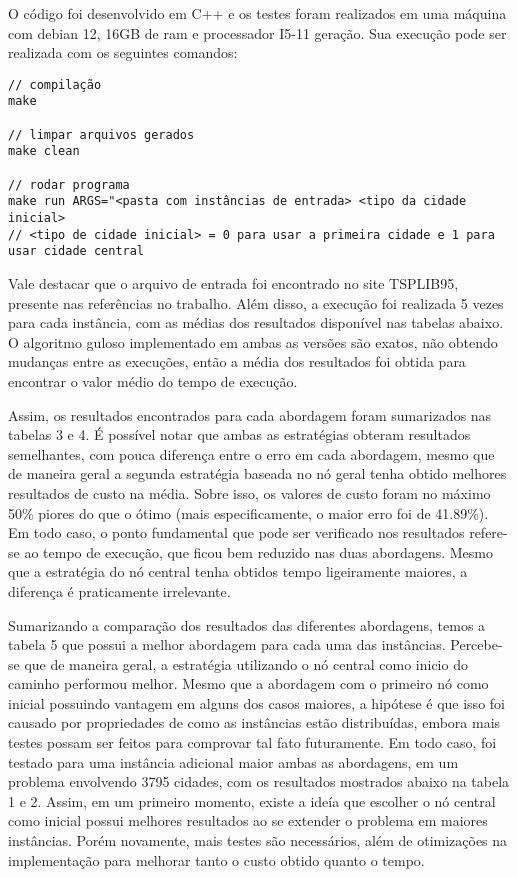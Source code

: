 \documentclass[10pt]{extarticle} %
\begin{document}
O código foi desenvolvido em C++ e os testes foram realizados em uma máquina com debian 12, 16GB de ram e processador I5-11 geração. Sua execução pode ser realizada com os seguintes comandos:

\begin{verbatim}
// compilação
make

// limpar arquivos gerados
make clean

// rodar programa
make run ARGS="<pasta com instâncias de entrada> <tipo da cidade inicial>
// <tipo de cidade inicial> = 0 para usar a primeira cidade e 1 para usar cidade central
\end{verbatim}

Vale destacar que o arquivo de entrada foi encontrado no site TSPLIB95, presente nas referências no trabalho. Além disso, a execução foi realizada 5 vezes para cada instância, com as médias dos resultados disponível nas tabelas abaixo. O algoritmo guloso implementado em ambas as versões são exatos, não obtendo mudanças entre as execuções, então a média dos resultados foi obtida para encontrar o valor médio do tempo de execução.

Assim, os resultados encontrados para cada abordagem foram sumarizados nas tabelas 3 e 4. É possível notar que ambas as estratégias obteram resultados semelhantes, com pouca diferença entre o erro em cada abordagem, mesmo que de maneira geral a segunda estratégia baseada no nó geral tenha obtido melhores resultados de custo na média. Sobre isso, os valores de custo foram no máximo 50\% piores do que o ótimo (mais especificamente, o maior erro foi de 41.89\%). Em todo caso, o ponto fundamental que pode ser verificado nos resultados refere-se ao tempo de execução, que ficou bem reduzido nas duas abordagens. Mesmo que a estratégia do nó central tenha obtidos tempo ligeiramente maiores, a diferença é praticamente irrelevante.

Sumarizando a comparação dos resultados das diferentes abordagens, temos a tabela 5 que possui a melhor abordagem para cada uma das instâncias. Percebe-se que de maneira geral, a estratégia utilizando o nó central como inicio do caminho performou melhor. Mesmo que a abordagem com o primeiro nó como inicial possuindo vantagem em alguns dos casos maiores, a hipótese é que isso foi causado por propriedades de como as instâncias estão distribuídas, embora mais testes possam ser feitos para comprovar tal fato futuramente. Em todo caso, foi testado para uma instância adicional maior ambas as abordagens, em um problema envolvendo 3795 cidades, com os resultados mostrados abaixo na tabela 1 e 2. Assim, em um primeiro momento, existe a ideía que escolher o nó central como inicial possui melhores resultados ao se extender o problema em maiores instâncias. Porém novamente, mais testes são necessários, além de otimizações na implementação para melhorar tanto o custo obtido quanto o tempo.
\end{document}

